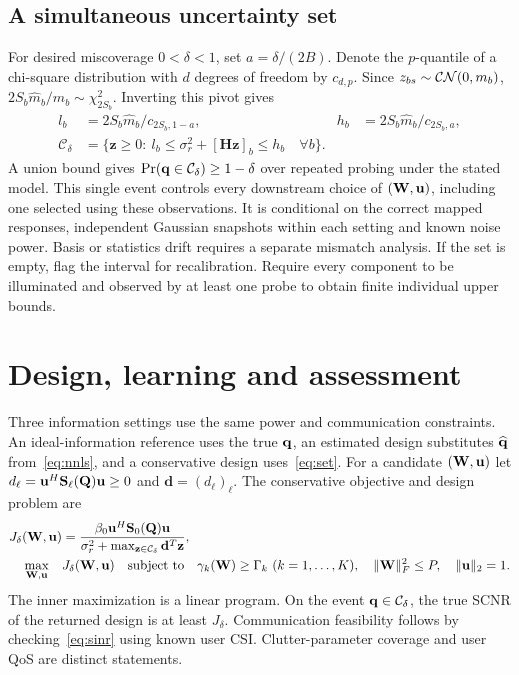 \subsection*{A simultaneous uncertainty set}
For desired miscoverage $0<\delta<1$, set $a=\delta/(2B)$. Denote the $p$-quantile of a chi-square distribution with $d$ degrees of freedom by $c_{d,p}$. Since $z_{bs}\sim\mathcal{CN}(0,m_b)$, $2S_b\widehat m_b/m_b\sim\chi^2_{2S_b}$. Inverting this pivot gives
\begin{align}
 l_b&=2S_b\widehat m_b/c_{2S_b,1-a},&
 h_b&=2S_b\widehat m_b/c_{2S_b,a},\\
 \mathcal C_\delta&=\{\mathbf z\geq0:\ l_b\leq \sigma_r^2+[\mathbf H\mathbf z]_b\leq h_b\quad\forall b\}.\label{eq:set}
\end{align}
A union bound gives $\Pr(\mathbf q\in\mathcal C_\delta)\geq1-\delta$ over repeated probing under the stated model. This single event controls every downstream choice of $(\mathbf W,\mathbf u)$, including one selected using these observations. It is conditional on the correct mapped responses, independent Gaussian snapshots within each setting and known noise power. Basis or statistics drift requires a separate mismatch analysis. If the set is empty, flag the interval for recalibration. Require every component to be illuminated and observed by at least one probe to obtain finite individual upper bounds.
\newpage
\section{Design, learning and assessment}
Three information settings use the same power and communication constraints. An ideal-information reference uses the true $\mathbf q$, an estimated design substitutes $\widehat{\mathbf q}$ from~\eqref{eq:nnls}, and a conservative design uses~\eqref{eq:set}. For a candidate $(\mathbf W,\mathbf u)$ let $d_\ell=\mathbf u^H\mathbf S_\ell(\mathbf Q)\mathbf u\geq0$ and $\mathbf d=(d_\ell)_\ell$. The conservative objective and design problem are
\begin{align}
 J_\delta(\mathbf W,\mathbf u)&=\frac{\beta_0\mathbf u^H\mathbf S_0(\mathbf Q)\mathbf u}
 {\sigma_r^2+\max_{\mathbf z\in\mathcal C_\delta}\mathbf d^T\mathbf z},\label{eq:J}\\
 \max_{\mathbf W,\mathbf u}\quad &J_\delta(\mathbf W,\mathbf u)
 \quad\text{subject to}\quad
 \gamma_k(\mathbf W)\geq\Gamma_k\ (k=1,\ldots,K),\quad
 \|\mathbf W\|_F^2\leq P,\quad\|\mathbf u\|_2=1.\label{eq:design}
\end{align}
The inner maximization is a linear program. On the event $\mathbf q\in\mathcal C_\delta$, the true SCNR of the returned design is at least $J_\delta$. Communication feasibility follows by checking~\eqref{eq:sinr} using known user CSI. Clutter-parameter coverage and user QoS are distinct statements.

